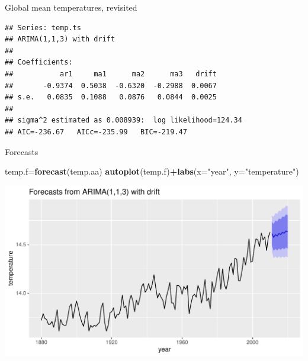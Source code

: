 \documentclass[ignorenonframetext,]{beamer}
\newenvironment{Shaded}{\begin{snugshade}}{\end{snugshade}}
\newcommand{\DataTypeTok}[1]{\textcolor[rgb]{0.13,0.29,0.53}{#1}}
\newcommand{\DecValTok}[1]{\textcolor[rgb]{0.00,0.00,0.81}{#1}}
\newcommand{\KeywordTok}[1]{\textcolor[rgb]{0.13,0.29,0.53}{\textbf{#1}}}
\newcommand{\NormalTok}[1]{#1}
\newcommand{\OperatorTok}[1]{\textcolor[rgb]{0.81,0.36,0.00}{\textbf{#1}}}
\newcommand{\StringTok}[1]{\textcolor[rgb]{0.31,0.60,0.02}{#1}}
\begin{document}
\begin{frame}[fragile]{Global mean temperatures, revisited}
\protect\hypertarget{global-mean-temperatures-revisited}{}

\begin{Shaded}
\end{Shaded}

\begin{verbatim}
## Series: temp.ts 
## ARIMA(1,1,3) with drift 
## 
## Coefficients:
##           ar1     ma1      ma2      ma3   drift
##       -0.9374  0.5038  -0.6320  -0.2988  0.0067
## s.e.   0.0835  0.1088   0.0876   0.0844  0.0025
## 
## sigma^2 estimated as 0.008939:  log likelihood=124.34
## AIC=-236.67   AICc=-235.99   BIC=-219.47
\end{verbatim}

\end{frame}

\begin{frame}[fragile]{Forecasts}
\protect\hypertarget{forecasts-1}{}

\begin{Shaded}
\begin{Highlighting}[]
\NormalTok{temp.f=}\KeywordTok{forecast}\NormalTok{(temp.aa)}
\KeywordTok{autoplot}\NormalTok{(temp.f)}\OperatorTok{+}\KeywordTok{labs}\NormalTok{(}\DataTypeTok{x=}\StringTok{"year"}\NormalTok{, }\DataTypeTok{y=}\StringTok{"temperature"}\NormalTok{)}
\end{Highlighting}
\end{Shaded}

\includegraphics{figure/unnamed-chunk-577-1.pdf}

\end{frame}
\end{document}
